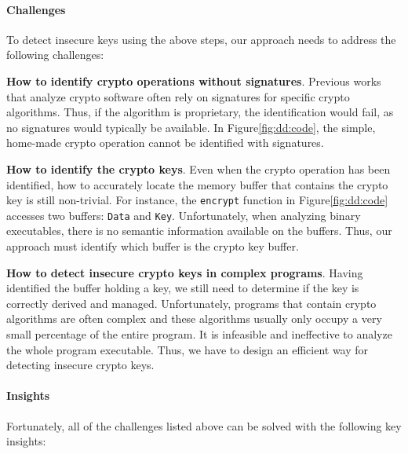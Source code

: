 \paragraph{Challenges} 
To detect insecure keys using the above steps, our approach needs to address the following challenges:
\begin{compactitem}
\item \textbf{How to identify crypto operations without signatures}. 
Previous works that analyze crypto software often rely on signatures for specific crypto algorithms. 
Thus, if the algorithm is proprietary, the identification would fail, as no signatures would typically be available. 
In Figure\autoref{fig:dd:code}, the simple, home-made crypto operation cannot be identified with signatures. 

\item \textbf{How to identify the crypto keys}.
Even when the crypto operation has been identified, how to accurately locate the memory buffer that contains the crypto key is still non-trivial. 
For instance, the \texttt{encrypt} function in Figure\autoref{fig:dd:code} accesses two buffers: \texttt{Data} and \texttt{Key}. 
Unfortunately, when analyzing binary executables, there is no semantic information available on the buffers. 
Thus, our approach must identify which buffer is the crypto key buffer. 

\item \textbf{How to detect insecure crypto keys in complex programs}.
Having identified the buffer holding a key, we still need to determine if the key is correctly derived and managed. 
Unfortunately, programs that contain crypto algorithms are often complex and these algorithms usually only occupy a very small percentage of the entire program. 
It is infeasible and ineffective to analyze the whole program executable. 
Thus, we have to design an efficient way for detecting insecure crypto keys.
\end{compactitem}



\paragraph{Insights} Fortunately, all of the challenges listed above can be solved with the following key insights:

